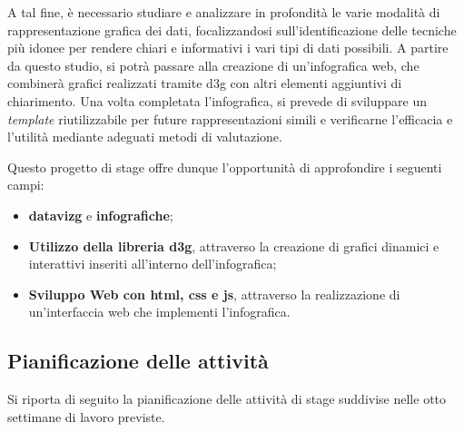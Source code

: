 A tal fine, è necessario studiare e analizzare in profondità le varie modalità di rappresentazione
grafica dei dati, focalizzandosi sull'identificazione delle tecniche più idonee per rendere chiari e
informativi i vari tipi di dati possibili. A partire da questo studio, si potrà passare alla creazione di un'infografica
web, che combinerà grafici realizzati tramite \gls{d3g} con altri elementi aggiuntivi di chiarimento. Una
volta completata l'infografica, si prevede di sviluppare un \emph{template} riutilizzabile per future rappresentazioni
simili e verificarne l'efficacia e l'utilità mediante adeguati metodi di valutazione. 

Questo progetto di stage offre dunque l'opportunità di approfondire i seguenti campi:
\begin{itemize}
    \item \textbf{\gls{datavizg}} e \textbf{infografiche};
    \item \textbf{Utilizzo della libreria \gls{d3g}}, attraverso la creazione di grafici dinamici e interattivi inseriti all'interno dell'infografica;
    \item \textbf{Sviluppo Web con \gls{html}, \gls{css} e \gls{js}}, attraverso la realizzazione di un'interfaccia web che implementi l'infografica.
\end{itemize}


\subsection{Pianificazione delle attività}
Si riporta di seguito la pianificazione delle attività di stage suddivise 
nelle otto settimane di lavoro previste.

